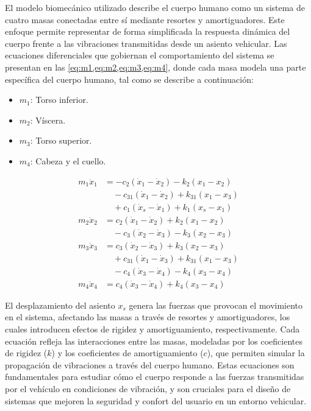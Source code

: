 El modelo biomecánico utilizado describe el cuerpo humano como un sistema
de cuatro masas conectadas entre sí mediante resortes y amortiguadores. Este
enfoque permite representar de forma simplificada la respuesta dinámica del
cuerpo frente a las vibraciones transmitidas desde un asiento vehicular. Las
ecuaciones diferenciales que gobiernan el comportamiento del sistema se
presentan en las \cref{eq:m1,eq:m2,eq:m3,eq:m4}, donde cada masa modela
una parte específica del cuerpo humano, tal como se describe a continuación:

\begin{itemize}
  \item \( m_1 \): Torso inferior.
  \item \( m_2 \): Víscera.
  \item \( m_3 \): Torso superior.
  \item \( m_4 \): Cabeza y el cuello.
\end{itemize}

\begin{align}
  m_1 \ddot{x}_1 &= -c_2 \left( \dot{x}_1 - \dot{x}_2 \right) - k_2 \left( x_1
  - x_2 \right) \label{eq:m1} \\
    &\quad - c_{31} \left( \dot{x}_1 - \dot{x}_2 \right) + k_{31} \left( x_1
    - x_3 \right) \nonumber \\
    &\quad + c_1 \left( \dot{x}_s - \dot{x}_1 \right) + k_1 \left( x_s -
    x_1 \right) \nonumber \\
  m_2 \ddot{x}_2 &= c_2 \left( \dot{x}_1 - \dot{x}_2 \right) + k_2 \left( x_1 -
  x_2 \right) \label{eq:m2} \\
    &\quad - c_3 \left( \dot{x}_2 - \dot{x}_3 \right) - k_3 \left( x_2 -
    x_3 \right) \nonumber \\
  m_3 \ddot{x}_3 &= c_3 \left( \dot{x}_2 - \dot{x}_3 \right) + k_3 \left( x_2 -
  x_3 \right) \label{eq:m3} \\
    &\quad + c_{31} \left( \dot{x}_1 - \dot{x}_3 \right) + k_{31} \left( x_1
    - x_3 \right) \nonumber \\
    &\quad - c_4 \left( \dot{x}_3 - \dot{x}_4 \right) - k_4 \left( x_3 -
    x_4 \right) \nonumber \\
  m_4 \ddot{x}_4 &= c_4 \left( \dot{x}_3 - \dot{x}_4 \right) + k_4 \left( x_3
  - x_4 \right) \label{eq:m4}
\end{align}

El desplazamiento del asiento \( x_s \) genera las fuerzas que provocan el
movimiento en el sistema, afectando las masas a través de resortes y
amortiguadores, los cuales introducen efectos de rigidez y amortiguamiento,
respectivamente. Cada ecuación refleja las interacciones entre las masas,
modeladas por los coeficientes de rigidez (\( k \)) y los coeficientes de
amortiguamiento (\( c \)), que permiten simular la propagación de vibraciones
a través del cuerpo humano. Estas ecuaciones son fundamentales para estudiar
cómo el cuerpo responde a las fuerzas transmitidas por el vehículo en condiciones
de vibración, y son cruciales para el diseño de sistemas que mejoren la seguridad
y confort del usuario en un entorno vehicular.
